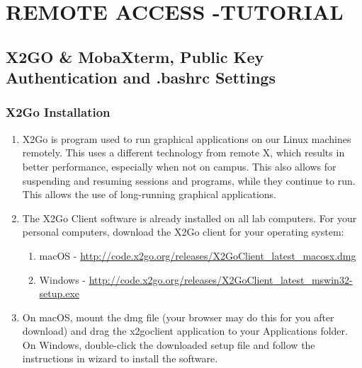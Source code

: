 \chapter*{REMOTE ACCESS -TUTORIAL}
\section*{X2GO \& MobaXterm, Public Key Authentication and .bashrc Settings}
\subsection{X2Go Installation}
\begin{enumerate}
	\item
	X2Go is program used to run graphical applications on our Linux machines remotely. This uses a different technology from remote X, which results in better performance, especially when not on campus. This also allows for suspending and resuming sessions and programs, while they continue to run. This allows the use of long-running graphical applications.
	\item The X2Go Client software is already installed on all lab computers. For your personal computers, download the X2Go client for your operating system:
	\begin{enumerate}[label*=\arabic*.]
		\item macOS - 		\url{http://code.x2go.org/releases/X2GoClient_latest_macosx.dmg}
		\item Windows - \url{http://code.x2go.org/releases/X2GoClient_latest_mswin32-setup.exe}
	\end{enumerate}
	\item On macOS, mount the dmg file (your browser may do this for you after download) and drag the x2goclient application to your Applications folder. On Windows, double-click the downloaded setup file and follow the instructions in  wizard to install the software.
\end{enumerate}
